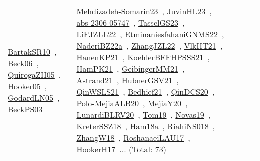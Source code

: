 {\begin{longtable}{lp{3cm}>{\raggedright\arraybackslash}p{6cm}>{\raggedright\arraybackslash}p{6cm}>{\raggedright\arraybackslash}p{8cm}}
\href{works/BartakSR10.pdf}{BartakSR10}~\cite{BartakSR10}, \href{works/Beck06.pdf}{Beck06}~\cite{Beck06}, \href{works/QuirogaZH05.pdf}{QuirogaZH05}~\cite{QuirogaZH05}, \href{works/Hooker05.pdf}{Hooker05}~\cite{Hooker05}, \href{works/GodardLN05.pdf}{GodardLN05}~\cite{GodardLN05}, \href{works/BeckPS03.pdf}{BeckPS03}~\cite{BeckPS03} & \href{works/Mehdizadeh-Somarin23.pdf}{Mehdizadeh-Somarin23}~\cite{Mehdizadeh-Somarin23}, \href{works/JuvinHL23.pdf}{JuvinHL23}~\cite{JuvinHL23}, \href{works/abs-2306-05747.pdf}{abs-2306-05747}~\cite{abs-2306-05747}, \href{works/TasselGS23.pdf}{TasselGS23}~\cite{TasselGS23}, \href{works/LiFJZLL22.pdf}{LiFJZLL22}~\cite{LiFJZLL22}, \href{works/EtminaniesfahaniGNMS22.pdf}{EtminaniesfahaniGNMS22}~\cite{EtminaniesfahaniGNMS22}, \href{works/NaderiBZ22a.pdf}{NaderiBZ22a}~\cite{NaderiBZ22a}, \href{works/ZhangJZL22.pdf}{ZhangJZL22}~\cite{ZhangJZL22}, \href{works/VlkHT21.pdf}{VlkHT21}~\cite{VlkHT21}, \href{works/HanenKP21.pdf}{HanenKP21}~\cite{HanenKP21}, \href{works/KoehlerBFFHPSSS21.pdf}{KoehlerBFFHPSSS21}~\cite{KoehlerBFFHPSSS21}, \href{works/HamPK21.pdf}{HamPK21}~\cite{HamPK21}, \href{works/GeibingerMM21.pdf}{GeibingerMM21}~\cite{GeibingerMM21}, \href{works/Astrand21.pdf}{Astrand21}~\cite{Astrand21}, \href{works/HubnerGSV21.pdf}{HubnerGSV21}~\cite{HubnerGSV21}, \href{works/QinWSLS21.pdf}{QinWSLS21}~\cite{QinWSLS21}, \href{works/Bedhief21.pdf}{Bedhief21}~\cite{Bedhief21}, \href{works/QinDCS20.pdf}{QinDCS20}~\cite{QinDCS20}, \href{works/Polo-MejiaALB20.pdf}{Polo-MejiaALB20}~\cite{Polo-MejiaALB20}, \href{works/MejiaY20.pdf}{MejiaY20}~\cite{MejiaY20}, \href{works/LunardiBLRV20.pdf}{LunardiBLRV20}~\cite{LunardiBLRV20}, \href{works/Tom19.pdf}{Tom19}~\cite{Tom19}, \href{works/Novas19.pdf}{Novas19}~\cite{Novas19}, \href{works/KreterSSZ18.pdf}{KreterSSZ18}~\cite{KreterSSZ18}, \href{works/Ham18a.pdf}{Ham18a}~\cite{Ham18a}, \href{works/RiahiNS018.pdf}{RiahiNS018}~\cite{RiahiNS018}, \href{works/ZhangW18.pdf}{ZhangW18}~\cite{ZhangW18}, \href{works/RoshanaeiLAU17.pdf}{RoshanaeiLAU17}~\cite{RoshanaeiLAU17}, \href{works/HookerH17.pdf}{HookerH17}~\cite{HookerH17}... (Total: 73)\\

\end{longtable}}
